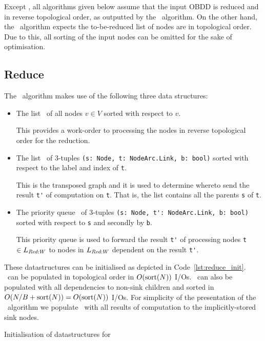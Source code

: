 Except \Reduce, all algorithms given below assume that the input OBDD is reduced
and in reverse topological order, as outputted by the \Reduce\ algorithm. On the
other hand, the \Reduce\ algorithm expects the to-be-reduced list of nodes are
in topological order. Due to this, all sorting of the input nodes can be omitted
for the sake of optimisation. \cite{Arge96}

\subsection{Reduce} \label{sec:theory__reduce}
The \Reduce\ algorithm makes use of the following three data structures:

\begin{itemize}
\item The list \ReduceLwork\ of all nodes $v \in V$ sorted with respect to $v$.

  This provides a work-order to processing the nodes in reverse topological
  order for the reduction.

\item The list \ReduceLdep\ of 3-tuples
  \lstinline{(s: Node, t: NodeArc.Link, b: bool)}
  sorted with respect to the label and index of \lstinline{t}.

  This is the transposed graph and it is used to determine whereto send the
  result \lstinline{t'} of computation on \lstinline{t}. That is, the list
  contains all the parents \lstinline{s} of \lstinline{t}.

\item The priority queue \ReduceQdep\ of 3-tuples
  \lstinline{(s: Node, t': NodeArc.Link, b: bool)} sorted with
  respect to \lstinline{s} and secondly by \lstinline{b}.

  This priority queue is used to forward the result \lstinline{t'} of processing
  nodes \lstinline{t} $\in L_{\mathit{Red:}W}$ to nodes in $L_{\mathit{Red:}W}$ dependent on
  the result \lstinline{t'}.
\end{itemize}
These datastructures can be initialised as depicted in
Code~\ref{lst:reduce_init}. \ReduceLwork\ can be populated in topological order
in $O(\text{sort}(N))$ I/Os. \ReduceLdep\ can also be populated with all dependencies
to non-sink children and sorted in $O(N/B + \text{sort}(N)) = O(\text{sort}(N))$ I/Os. For
simplicity of the presentation of the \Reduce\ algorithm we populate
\ReduceQdep\ with all results of computation to the implicitly-stored sink
nodes.

\begin{lstfloat}[ht!]
  \centering

  

  \caption{Initialisation of datastructures for \Reduce}
  \label{lst:reduce_init}
\end{lstfloat}

